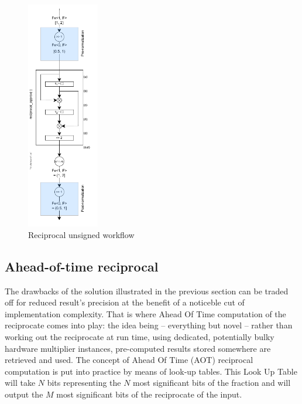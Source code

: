     

\begin{figure}
    \centering
    \includegraphics[width=0.28\textwidth]{figures/reciprocal_unsigned.drawio.pdf}
    \caption{Reciprocal unsigned workflow}
    \label{fig:reciprocal_unsigned_workflow}
\end{figure}

\subsection{Ahead-of-time reciprocal}\label{aot_reciprocal_lut_technique}


The drawbacks of the solution illustrated in the previous section can be traded off for reduced result's precision at the benefit of a noticeble cut of implementation complexity.
That is where Ahead Of Time computation of the reciprocate comes into play: the idea being -- everything but novel -- rather than working out the reciprocate at run time, using dedicated, potentially bulky hardware multiplier instances, pre-computed results stored somewhere are retrieved and used.
The concept of Ahead Of Time (AOT) reciprocal computation is put into practice by means of look-up tables. This Look Up Table will take $N$ bits representing the $N$ most significant bits of the fraction and will output the $M$ most significant bits of the reciprocate of the input.

